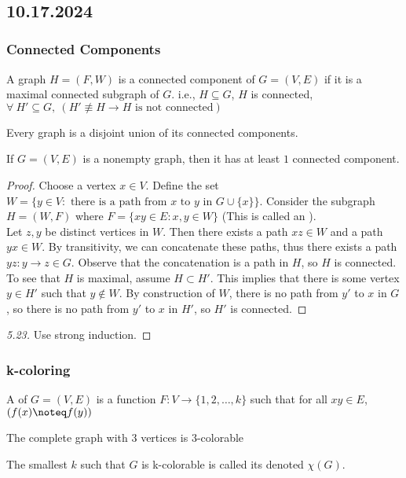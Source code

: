 \documentclass[11pt]{scrartcl}
\begin{document}
\noindent
\Line
\\
\subsection{10.17.2024}
\subsubsection{Connected Components}
\begin{definition}
    A graph $H=(F, W)$ is a connected component of $G=(V, E)$ if it is a maximal connected subgraph of $G$. i.e., $H \subseteq G$, $H$ is connected, $\forall~H' \subseteq G, ~(H' \nequiv H \rightarrow H \text{ is not connected})$
\end{definition}
\begin{theorem}
    Every graph is a disjoint union of its connected components.
\end{theorem}
\begin{lemma}
    If $G=(V, E)$ is a nonempty graph, then it has at least $1$ connected component. 
\end{lemma}
\begin{proof}
    Choose a vertex $x \in V$. Define the set $W = \{y \in V : \text{ there is a path from } x \text{ to } y \text{ in } G \cup \{x\}\}$.  Consider the subgraph $H = (W, F)$ where $F= \{xy \in E : x, y \in W\}$ (This is called an ).  \\
    Let $z,y$ be distinct vertices in $W$.  Then there exists a path $xz \in W$ and a path $yx \in W$.  By transitivity, we can concatenate these paths, thus there exists a path $yz: y \rightarrow z \in G$.  Observe that the concatenation is a path in $H$, so $H$ is connected.\\
    To see that $H$ is maximal, assume $H \subset H'$.  This implies that there is some vertex $y \in H'$ such that $y \notin W$.  By construction of $W$, there is no path from $y'$ to $x$ in $G$, so there is no path from $y'$ to $x$ in $H'$, so $H'$ is connected.
\end{proof}
\begin{proof}[5.23]
    Use strong induction.
\end{proof}
\subsubsection{k-coloring}
\begin{definition}
    A  of $G=(V, E)$ is a function $F: V \rightarrow \{1, 2, \dots, k\}$ such that for all $xy \in E$, $(f(x) \noteq f(y))$
\end{definition}
\begin{example}
    The complete graph with $3$ vertices is $3$-colorable
\end{example}
The smallest $k$ such that $G$ is k-colorable is called its  denoted $\chi(G)$.
\end{document}
